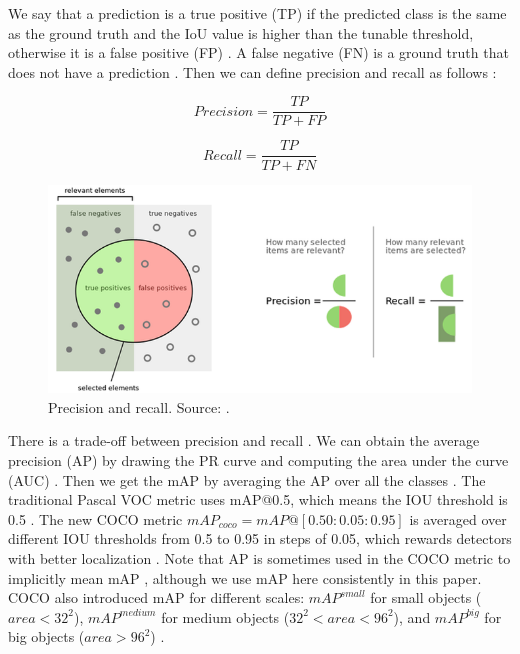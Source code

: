 \documentclass[a4paper, 11pt, oneside]{article}
\begin{document}
We say that a prediction is a true positive (TP) if the predicted class is the same as the ground truth and the IoU
value is higher than the tunable threshold, otherwise it is a false positive (FP)
\cite{liu2020deep, elgendy2020deep, planche2019hands}. A false negative (FN) is a ground truth that does not have a
prediction \cite{planche2019hands}. Then we can define precision and recall as follows
\cite{burkov2019hundred, davis2006relationship}:

$$Precision = \frac{TP}{TP + FP}$$

$$Recall = \frac{TP}{TP + FN}$$

\begin{figure}[ht]
  \begin{center}
    \includegraphics[width=\textwidth]{precision_recall.png}
  \end{center}
  \caption{Precision and recall. Source: \cite{precisionrecall}.}
\end{figure}

There is a trade-off between precision and recall
\cite{elgendy2020deep, geron2019hands, burkov2019hundred, planche2019hands}. We can obtain the average precision
(AP) by drawing the PR curve and computing the area under the curve (AUC) \cite{elgendy2020deep, planche2019hands}.
Then we get the mAP by averaging the AP over all the classes \cite{elgendy2020deep, geron2019hands, planche2019hands}.
The traditional Pascal VOC metric uses mAP@0.5, which means the IOU threshold is 0.5
\cite{liu2020deep, everingham2010pascal}. The new COCO metric $mAP_{coco} = mAP@[0.50:0.05:0.95]$ is averaged over
different IOU thresholds from 0.5 to 0.95 in steps of 0.05, which rewards detectors with better localization
\cite{liu2020deep, cocometrics}. Note that AP is sometimes used in the COCO metric to implicitly mean mAP
\cite{cocometrics}, although we use mAP here consistently in this paper. COCO also introduced mAP for different scales:
$mAP^{small}$ for small objects ($area < 32^2$), $mAP^{medium}$ for medium objects ($32^2 < area < 96^2$),
and $mAP^{big}$ for big objects ($area > 96^2$) \cite{liu2020deep, cocometrics}.
\end{document}
